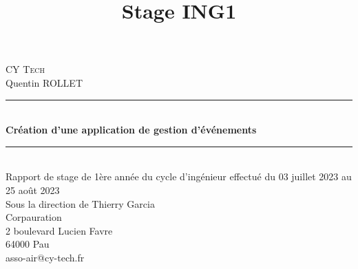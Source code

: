 

\RequirePackage{babel} %
\RequirePackage[utf8]{inputenc} %
\RequirePackage[section]{placeins}%
\RequirePackage[T1]{fontenc} %
\RequirePackage{float} %
\RequirePackage{graphicx} %
\RequirePackage[justification=centering]{caption} %
\RequirePackage{subcaption}
\RequirePackage{wallpaper}
\RequirePackage{nomencl}
\RequirePackage{fancyhdr}
\setlength{\headheight}{2cm}
\RequirePackage{url}
\RequirePackage[hidelinks]{hyperref}%
\RequirePackage[left=2.5cm,right=2.5cm,top=4cm,bottom=4cm]{geometry} %
\RequirePackage{tikz}


\cfoot{\thepage}

\title{Stage ING1}




\begin{titlepage}
	\newcommand{\HRule}{\rule{\linewidth}{0.5mm}}
	\center
	\textsc{\LARGE
	CY Tech
	} \\[1cm]
	Quentin ROLLET\\[1cm]
	\HRule \\[0.4cm]
	{ \huge \bfseries Création d'une application de gestion d'événements \\[0.15cm] }
	\HRule \\[1.5cm]
	Rapport de stage de 1ère année du cycle d'ingénieur effectué du 03 juillet 2023 au 25 août 2023
	\\[1cm]
	
	Sous la direction de Thierry Garcia
	\\[5cm]
	
	Corpauration\\
	2 boulevard Lucien Favre\\
	64000 Pau\\
	asso-air@cy-tech.fr\\
\end{titlepage}


